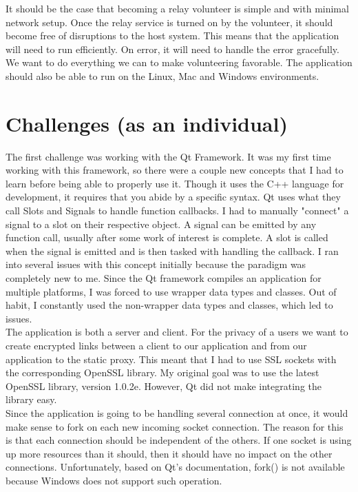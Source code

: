 \documentclass[12pt,a4paper]{report}
\begin{document}
	It should be the case that becoming a relay volunteer is simple and with minimal network setup. Once the relay service is turned on by the volunteer, it should become free of disruptions to the host system. This means that the application will need to run efficiently. On error, it will need to handle the error gracefully. We want to do everything we can to make volunteering favorable. The application should also be able to run on the Linux, Mac and Windows environments. 
	
	\section{Challenges (as an individual)}
	The first challenge was working with the Qt Framework. It was my first time working with this framework, so there were a couple new concepts that I had to learn before being able to properly use it. Though it uses the C++ language for development, it requires that you abide by a specific syntax. Qt uses what they call Slots and Signals to handle function callbacks. I had to manually "connect" a signal to a slot on their respective object. A signal can be emitted by any function call, usually after some work of interest is complete. A slot is called when the signal is emitted and is then tasked with handling the callback. I ran into several issues with this concept initially because the paradigm was completely new to me. Since the Qt framework compiles an application for multiple platforms, I was forced to use wrapper data types and classes. Out of habit, I constantly used the non-wrapper data types and classes, which led to issues.\\       
	
	The application is both a server and client. For the privacy of a users we want to create encrypted links between a client to our application and from our application to the static proxy. This meant that I had to use SSL sockets with the corresponding OpenSSL library. My original goal was to use the latest OpenSSL library, version 1.0.2e. However, Qt did not make integrating the library easy. \\ 
	
	Since the application is going to be handling several connection at once, it would make sense to fork on each new incoming socket connection. The reason for this is that each connection should be independent of the others. If one socket is using up more resources than it should, then it should have no impact on the other connections. Unfortunately, based on Qt's documentation, fork() is not available because Windows does not support such operation. 
	
\end{document}
